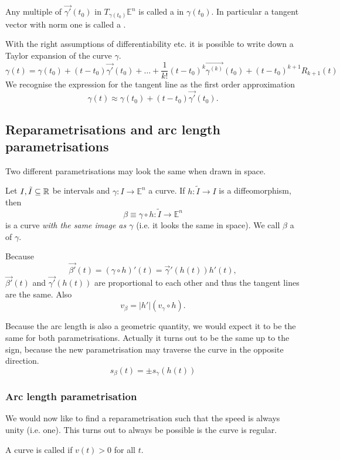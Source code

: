 Any multiple of $\vec{\gamma'}(t_0)$ in $T_{\gamma(t_0)}\mathbb{E}^n$ is called a  in $\gamma(t_0)$. In particular a tangent vector with norm one is called a .

\begin{note}
With the right assumptions of differentiability etc. it is possible to write down a Taylor expansion of the curve $\gamma$.
\[ \gamma(t) = \gamma(t_0) + (t-t_0)\vec{\gamma'}(t_0) + \ldots + \frac{1}{k!}(t-t_0)^k\vec{\gamma^{(k)}}(t_0) + (t-t_0)^{k+1}R_{k+1}(t) \]
We recognise the expression for the tangent line as the first order approximation
\[ \gamma(t) \approx \gamma(t_0) + (t-t_0)\vec{\gamma'}(t_0). \]
\end{note}

\subsection{Reparametrisations and arc length parametrisations}
Two different parametrisations may look the same when drawn in space.

\begin{definition}
Let $I, \tilde{I} \subseteq \mathbb{R}$ be intervals and $\gamma: I \to \mathbb{E}^n$ a curve.
If $h: \tilde{I} \to I$ is a diffeomorphism, then 
\[ \beta \equiv \gamma \circ h: \tilde{I} \to \mathbb{E}^n \]
is a curve \textit{with the same image as $\gamma$} (i.e. it looks the same in space). We call $\beta$ a  of $\gamma$.
\end{definition}
Because
\[ \vec{\beta'}(t) = (\gamma\circ h)'(t) = \vec{\gamma}'(h(t))h'(t), \]
$\vec{\beta'}(t)$ and $\vec{\gamma'}(h(t))$ are proportional to each other and thus the tangent lines are the same. Also
\[ v_\beta = |h'|(v_\gamma\circ h). \]

Because the arc length is also a geometric quantity, we would expect it to be the same for both parametrisations. Actually it turns out to be the same up to the sign, because the new parametrisation may traverse the curve in the opposite direction.
\[ s_\beta(t) = \pm s_\gamma(h(t)) \]

\subsubsection{Arc length parametrisation}
We would now like to find a reparametrisation such that the speed is always unity (i.e. one). This turns out to always be possible is the curve is regular.
\begin{definition}
A curve is called  if $v(t) > 0$ for all $t$.
\end{definition}

